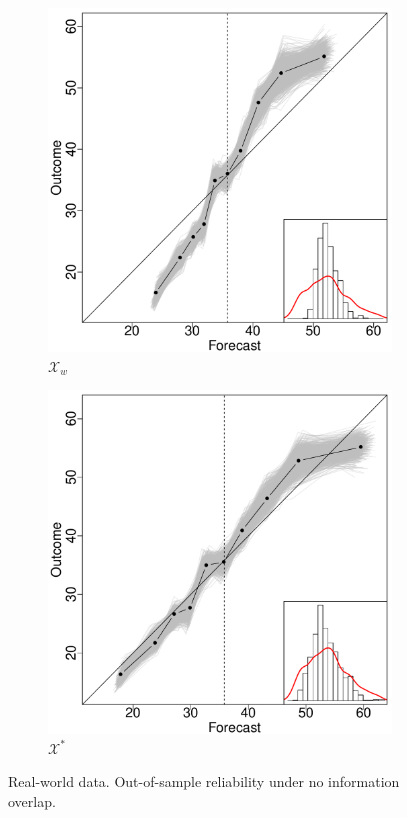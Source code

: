 \documentclass[11pt]{article}
\theoremstyle{definition}
\theoremstyle{definition}
\begin{document}
\begin{figure}[H]
\begin{subfigure}[b]{0.323\textwidth}
                \includegraphics[width=\textwidth]{IndependentOLP.pdf}
                \caption{$\mathcal{X}_w$}
                \label{fig:gull}
        \end{subfigure}%
         \begin{subfigure}[b]{0.323\textwidth}
                \includegraphics[width=\textwidth]{IndependentE-OLP.pdf}
                \caption{$\mathcal{X}^*$}
                \label{RelDiagramNoE}
             \end{subfigure}
          \caption{Real-world data. Out-of-sample reliability under no information overlap. }
           \label{RelDiagramNo}
\end{figure}
\end{document}
